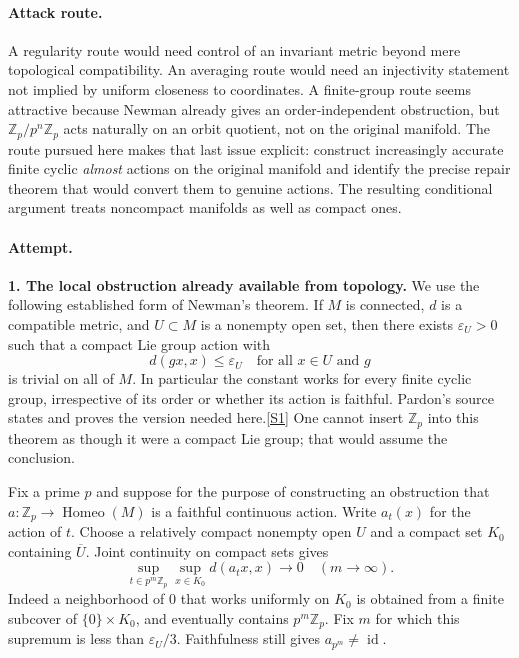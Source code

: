 \documentclass[11pt,a4paper]{article}
\newcommand{\Z}{\mathbb{Z}}
\newcommand{\sref}[2]{\hyperlink{source:#1:#2}{[S#2]}}
\begin{document}
\paragraph{Attack route.}
A regularity route would need control of an invariant metric beyond mere
topological compatibility. An averaging route would need an injectivity
statement not implied by uniform closeness to coordinates. A finite-group
route seems attractive because Newman already gives an order-independent
obstruction, but $\Z_p/p^n\Z_p$ acts naturally on an orbit quotient, not
on the original manifold. The route pursued here makes that last issue
explicit: construct increasingly accurate finite cyclic \emph{almost}
actions on the original manifold and identify the precise repair theorem
that would convert them to genuine actions. The resulting conditional
argument treats noncompact manifolds as well as compact ones.

\paragraph{Attempt.}
\textbf{1. The local obstruction already available from topology.}
We use the following established form of Newman's theorem. If $M$ is
connected, $d$ is a compatible metric, and $U\subset M$ is a nonempty
open set, then there exists $\varepsilon_U>0$ such that a compact Lie
group action with
\[
 d(gx,x)\le\varepsilon_U\quad\text{for all }x\in U\text{ and }g
\]
is trivial on all of $M$. In particular the constant works for every
finite cyclic group, irrespective of its order or whether its action
is faithful. Pardon's source states and proves the version needed
here.\sref{statement}{1}
One cannot insert $\Z_p$ into this theorem as though it were a compact
Lie group; that would assume the conclusion.

Fix a prime $p$ and suppose for the purpose of constructing an obstruction
that $a:\Z_p\to\operatorname{Homeo}(M)$ is a faithful continuous action.
Write $a_t(x)$ for the action of $t$. Choose a relatively compact nonempty
open $U$ and a compact set $K_0$ containing $\overline U$. Joint continuity
on compact sets gives
\[
 \sup_{t\in p^m\Z_p}\sup_{x\in K_0}d(a_t x,x)\longrightarrow0
 \quad(m\to\infty). \tag{207.1}
\]
Indeed a neighborhood of $0$ that works uniformly on $K_0$ is obtained
from a finite subcover of $\{0\}\times K_0$, and eventually contains
$p^m\Z_p$. Fix $m$ for which this supremum is less than
$\varepsilon_U/3$. Faithfulness still gives $a_{p^m}\ne\operatorname{id}$.
\end{document}
